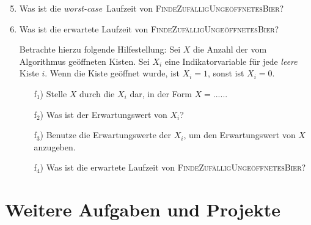 \documentclass{uebung_cs}
\begin{document}
\begin{exercise}[Bierkisten]
	\begin{enumerate}
		\setcounter{enumi}{4}
		\item Was ist die \textit{worst-case}~Laufzeit von \textsc{FindeZufälligUngeöffnetesBier}?
		\item Was ist die erwartete Laufzeit von \textsc{FindeZufälligUngeöffnetesBier}?
		\item[] Betrachte hierzu folgende Hilfestellung: Sei $X$ die Anzahl der vom Algorithmus geöffneten Kisten. Sei $X_i$ eine Indikatorvariable für jede \emph{leere} Kiste $i$. Wenn die Kiste geöffnet wurde, ist $X_i = 1$, sonst ist $X_i = 0$. 
		\begin{itemize}[topsep=0.21cm, leftmargin=1.2cm]
			\item[f$_1$)] Stelle $X$ durch die $X_i$ dar, in der Form $X = .....$.
			\item[f$_2$)] Was ist der Erwartungswert von $X_i$?
			\item[f$_3$)] Benutze die Erwartungswerte der $X_i$, um den Erwartungswert von $X$ anzugeben.
			\item[f$_4$)] Was ist die erwartete Laufzeit von \textsc{FindeZufälligUngeöffnetesBier}?
		\end{itemize}
	\end{enumerate}
\end{exercise}

\section*{Weitere Aufgaben und Projekte}
\end{document}
